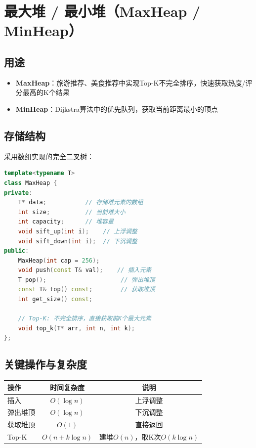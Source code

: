 \documentclass[12pt,a4paper]{report}
\begin{document}
\section{最大堆 / 最小堆（MaxHeap / MinHeap）}

\subsection{用途}
\begin{itemize}
    \item \textbf{MaxHeap}：旅游推荐、美食推荐中实现Top-K不完全排序，快速获取热度/评分最高的K个结果
    \item \textbf{MinHeap}：Dijkstra算法中的优先队列，获取当前距离最小的顶点
\end{itemize}

\subsection{存储结构}

采用数组实现的完全二叉树：

\begin{lstlisting}[language=C++, caption={堆数据结构定义}]
template<typename T>
class MaxHeap {
private:
    T* data;           // 存储堆元素的数组
    int size;          // 当前堆大小
    int capacity;      // 堆容量
    void sift_up(int i);    // 上浮调整
    void sift_down(int i);  // 下沉调整
public:
    MaxHeap(int cap = 256);
    void push(const T& val);    // 插入元素
    T pop();                     // 弹出堆顶
    const T& top() const;        // 获取堆顶
    int get_size() const;

    // Top-K: 不完全排序，直接获取前K个最大元素
    void top_k(T* arr, int n, int k);
};
\end{lstlisting}

\subsection{关键操作与复杂度}

\begin{table}[H]
\centering
\begin{tabular}{lcc}
\toprule
\textbf{操作} & \textbf{时间复杂度} & \textbf{说明} \\
\midrule
插入 & $O(\log n)$ & 上浮调整 \\
弹出堆顶 & $O(\log n)$ & 下沉调整 \\
获取堆顶 & $O(1)$ & 直接返回 \\
Top-K & $O(n + k \log n)$ & 建堆$O(n)$，取K次$O(k \log n)$ \\
\bottomrule
\end{tabular}
\end{table}
\end{document}
